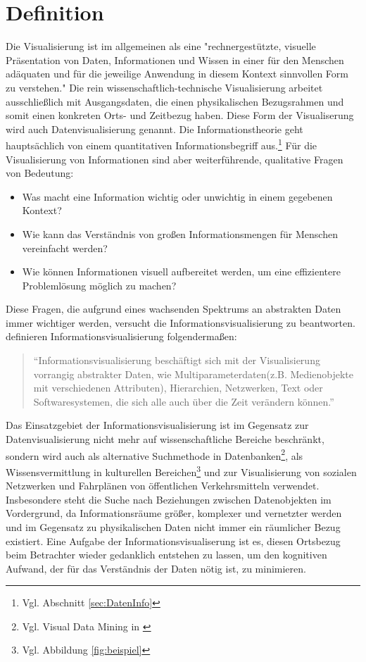 \documentclass[a4paper, 12pt, DIVcalc, onepage, pdftex, headsepline, footsepline]{scrreprt}
\begin{document}
\section{Definition}
\label{sec:Definition}
Die Visualisierung ist im allgemeinen als eine "rechnergestützte, visuelle Präsentation von Daten, Informationen und Wissen
in einer für den Menschen adäquaten und für die jeweilige Anwendung in diesem Kontext sinnvollen Form
zu verstehen."\citep[S.\,3]{Schumann}
Die rein wissenschaftlich-technische Visualisierung arbeitet ausschließlich mit Ausgangsdaten,
die einen physikalischen Bezugsrahmen und somit einen konkreten Orts- und Zeitbezug haben. Diese Form der
Visualiserung wird auch Datenvisualisierung genannt.
Die Informationstheorie geht hauptsächlich von einem quantitativen Informationsbegriff aus.\footnote{Vgl. 
Abschnitt \ref{sec:DatenInfo}} Für die Visualisierung von Informationen sind aber
weiterführende, qualitative Fragen von Bedeutung:
\begin{itemize}
\item Was macht eine Information wichtig oder unwichtig in einem gegebenen Kontext?
\item Wie kann das Verständnis von großen Informationsmengen für Menschen vereinfacht werden?
\item Wie können Informationen visuell aufbereitet werden, um eine effizientere Problemlösung möglich zu machen?
\end{itemize}
Diese Fragen, die aufgrund eines wachsenden Spektrums an abstrakten Daten immer wichtiger werden,
versucht die Informationsvisualisierung zu beantworten.
\citep[S.\,434]{Preim} definieren Informationsvisualisierung folgendermaßen:
\begin{quote}
"`Informationsvisualisierung beschäftigt sich mit der Visualisierung vorrangig abstrakter Daten, wie
Multiparameterdaten(z.B. Medienobjekte mit verschiedenen Attributen), Hierarchien, Netzwerken, Text
oder Softwaresystemen, die sich alle auch über die Zeit verändern können."'
\end{quote}
Das Einsatzgebiet der Informationsvisualisierung ist im Gegensatz zur Datenvisualisierung nicht mehr
auf wissenschaftliche Bereiche beschränkt,
sondern wird auch als alternative Suchmethode in Datenbanken\footnote{Vgl. Visual Data Mining in \citep{Keim}},
als Wissensvermittlung in kulturellen Bereichen\footnote{Vgl. Abbildung \ref{fig:beispiel}} und zur Visualisierung von
sozialen Netzwerken und Fahrplänen von öffentlichen Verkehrsmitteln verwendet.
Insbesondere steht die Suche nach Beziehungen zwischen Datenobjekten im Vordergrund,
da Informationsräume größer, komplexer und vernetzter werden und im Gegensatz
zu physikalischen Daten nicht immer ein räumlicher Bezug existiert.
Eine Aufgabe der Informationsvisualiserung ist es, diesen Ortsbezug beim Betrachter wieder gedanklich
entstehen zu lassen, um den kognitiven Aufwand, der für das Verständnis der Daten nötig ist, zu minimieren.
\end{document}
